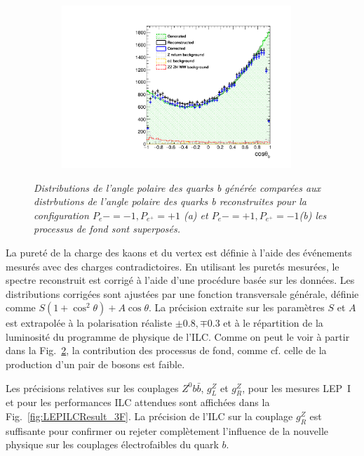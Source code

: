 \begin{figure}
\begin{subfigure}{0.5\textwidth}
		\centering
		\includegraphics[width=0.95\textwidth]{ILD/plots/basymmetry-final-right.pdf}
		\caption{\label{fig:BAsymmetryFinal_b_3F} }
	\end{subfigure}
	\caption{\sl Distributions de l'angle polaire des quarks b générée comparées aux distrbutions de l'angle polaire des quarks b reconstruites pour la configuration $P_{e}-=-1, P_{e^+}=+1$ (a) et $P_{e}-=+1, P_{e^+}=-1$(b) les processus de fond sont superposés.}
	\label{fig:BAsymmetryFinal_3F}
\end{figure}

La pureté de la charge des kaons et du vertex est définie à l'aide des événements mesurés avec des charges contradictoires. En utilisant les puretés mesurées, le spectre reconstruit est corrigé à l'aide d'une procédure basée sur les données.
Les distributions corrigées sont ajustées par une fonction transversale générale, définie comme $S(1+\cos^2\theta) + A\cos\theta$. La précision extraite sur les paramètres $S$ et $A$ est extrapolée à la polarisation réaliste $\pm 0.8, \mp 0.3$ et à le répartition de la luminosité du programme de physique de l'ILC.
Comme on peut le voir à partir dans la Fig.~\ref{fig:BAsymmetryFinal_3F}, la contribution des processus de fond, comme cf. celle de la production d'un pair de bosons est faible.


Les précisions relatives sur les couplages $Z^0 b\bar{b}$, $g_L^Z$ et $g_R^Z$, pour les mesures LEP~I et pour les performances ILC attendues sont affichées dans la Fig.~\ref{fig:LEPILCResult_3F}.
La précision de l'ILC sur la couplage $g_R^Z$ est suffisante pour confirmer ou rejeter complètement l'influence de la nouvelle physique sur les couplages électrofaibles du quark $b$.

